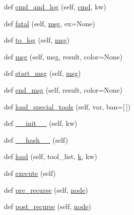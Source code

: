\begin{DoxyCompactItemize}
\item 
def \hyperlink{classwaflib_1_1_context_1_1_context_aaa63c5a7ac60f1bf164febe6642d270f}{cmd\+\_\+and\+\_\+log} (self, \hyperlink{sndfile__play_8m_adfc5ba7e22f5e4a6221c12a70503bef3}{cmd}, kw)
\item 
def \hyperlink{classwaflib_1_1_context_1_1_context_a42739307965d7ef470985d7bb7408788}{fatal} (self, \hyperlink{classwaflib_1_1_context_1_1_context_a7495a2e04e528aa54bda3cadf08240cb}{msg}, ex=None)
\item 
def \hyperlink{classwaflib_1_1_context_1_1_context_a596fa2d8dc5a61602101f43ec1eb3e7e}{to\+\_\+log} (self, \hyperlink{classwaflib_1_1_context_1_1_context_a7495a2e04e528aa54bda3cadf08240cb}{msg})
\item 
def \hyperlink{classwaflib_1_1_context_1_1_context_a7495a2e04e528aa54bda3cadf08240cb}{msg} (self, msg, result, color=None)
\item 
def \hyperlink{classwaflib_1_1_context_1_1_context_a344a0dff2c7b0d2d76057d55b83c3f16}{start\+\_\+msg} (self, \hyperlink{classwaflib_1_1_context_1_1_context_a7495a2e04e528aa54bda3cadf08240cb}{msg})
\item 
def \hyperlink{classwaflib_1_1_context_1_1_context_a6340799a7fa4dc1230d13b7c08eec789}{end\+\_\+msg} (self, result, color=None)
\item 
def \hyperlink{classwaflib_1_1_context_1_1_context_a95a53e6c363450df77f847bec6c56696}{load\+\_\+special\+\_\+tools} (self, var, ban=\mbox{[}$\,$\mbox{]})
\item 
def \hyperlink{classwaflib_1_1_context_1_1_context_ab8fabf802b21a8a8e77c3e3811c58c84}{\+\_\+\+\_\+init\+\_\+\+\_\+} (self, kw)
\item 
def \hyperlink{classwaflib_1_1_context_1_1_context_ae8096e428213ed965d8cd5629c2481a1}{\+\_\+\+\_\+hash\+\_\+\+\_\+} (self)
\item 
def \hyperlink{classwaflib_1_1_context_1_1_context_ad214db6a7b3ce05051972f7d073a74f2}{load} (self, tool\+\_\+list, \hyperlink{rfft2d_test_m_l_8m_adc468c70fb574ebd07287b38d0d0676d}{k}, kw)
\item 
def \hyperlink{classwaflib_1_1_context_1_1_context_ae98aa77cb954743799c5b730c6775329}{execute} (self)
\item 
def \hyperlink{classwaflib_1_1_context_1_1_context_a290c81ad18ad9b3c0bcbde2d8fce519e}{pre\+\_\+recurse} (self, \hyperlink{structnode}{node})
\item 
def \hyperlink{classwaflib_1_1_context_1_1_context_ab818cd610ecc0c6fa981f0cde9f3dd13}{post\+\_\+recurse} (self, \hyperlink{structnode}{node})

\end{DoxyCompactItemize}
